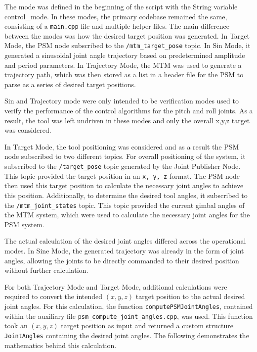 The mode was defined in the beginning of the script with the String variable control\_mode. In these modes, the primary codebase remained the same, consisting of a \texttt{main.cpp} file and multiple helper files. The main difference between the modes was how the desired target position was generated. In Target Mode, the PSM node subscribed to the \texttt{/mtm\_target\_pose} topic. In Sin Mode, it generated a sinusoidal joint angle trajectory based on predetermined amplitude and period parameters. In Trajectory Mode, the MTM was used to generate a trajectory path, which was then stored as a list in a header file for the PSM to parse as a series of desired target positions.

Sin and Trajectory mode were only intended to be verification modes used to verify the performance of the control algorithms for the pitch and roll joints. As a result, the tool was left undriven in these modes and only the overall x,y,z target was considered. 

In Target Mode, the tool positioning was considered and as a result the PSM node subscribed to two different topics. For overall positioning of the system, it subscribed to the \texttt{/target\_pose} topic generated by the Joint Publisher Node. This topic provided the target position in an \texttt{x, y, z} format. The PSM node then used this target position to calculate the necessary joint angles to achieve this position. Additionally, to determine the desired tool angles, it subscribed to the \texttt{/mtm\_joint\_states} topic. This topic provided the current gimbal angles of the MTM system, which were used to calculate the necessary joint angles for the PSM system.

The actual calculation of the desired joint angles differed across the operational modes. In Sine Mode, the generated trajectory was already in the form of joint angles, allowing the joints to be directly commanded to their desired position without further calculation.

For both Trajectory Mode and Target Mode, additional calculations were required to convert the intended $(x, y, z)$ target position to the actual desired joint angles. For this calculation, the function \texttt{computePSMJointAngles}, contained within the auxiliary file \texttt{psm\_compute\_joint\_angles.cpp}, was used. This function took an $(x, y, z)$ target position as input and returned a custom structure \texttt{JointAngles} containing the desired joint angles. The following demonstrates the mathematics behind this calculation. 


